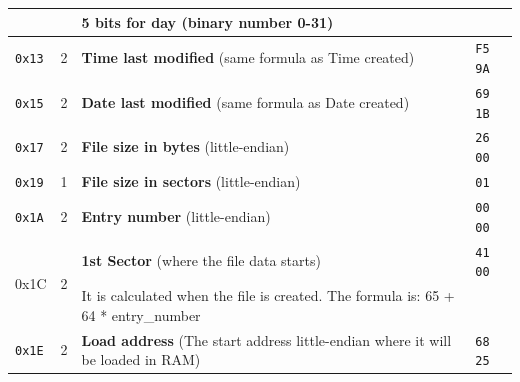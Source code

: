 \documentclass[a4paper,11pt]{article}
\begin{document}
\begin{longtable}{ |m{1cm}|m{1.3cm}|m{6.8cm}|m{2.7cm}| }
            & & 5 bits for day (binary number 0-31) &\\
            \hline
            \texttt{0x13} & 2 & \textbf{Time last modified} (same formula as
            Time created) & \texttt{F5 9A}\\
            \hline
            \texttt{0x15} & 2 & \textbf{Date last modified} (same formula as
            Date created) & \texttt{69 1B}\\
            \hline
            \texttt{0x17} & 2 & \textbf{File size in bytes} (little-endian) &
            \texttt{26 00}\\
            \hline
            \texttt{0x19} & 1 & \textbf{File size in sectors} (little-endian) &
            \texttt{01}\\
            \hline
            \texttt{0x1A} & 2 & \textbf{Entry number} (little-endian) &
            \texttt{00 00}\\
            \hline
            \multirow{2}{4em}{0x1C} & \multirow{2}{4em}{2} & \textbf{1st Sector}
            (where the file data starts) & \texttt{41 00}\\
            & & It is calculated when the file is created. The formula is: 65 + 
            64 * entry\_number &\\
            \hline
            \texttt{0x1E} & 2 & \textbf{Load address} (The start address
            little-endian where it will be loaded in RAM) & \texttt{68 25}\\
            \hline
        \end{longtable}
\end{document}

